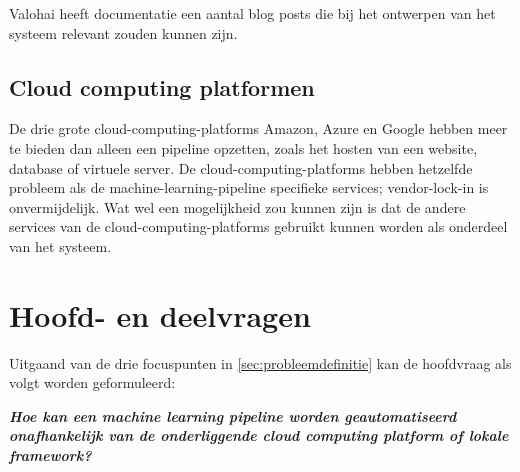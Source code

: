 Valohai heeft documentatie een aantal blog posts die bij het ontwerpen van het systeem relevant zouden kunnen zijn.

\subsection{Cloud computing platformen}\label{subsec:cloud-computing-platformen}
De drie grote \glspl{cloud-computing-platform} Amazon, Azure en Google hebben meer te bieden dan alleen een pipeline opzetten, zoals het hosten van een website, database of virtuele server. De \glspl{cloud-computing-platform} hebben hetzelfde probleem als de \gls{machine-learning-pipeline} specifieke services; \gls{vendor-lock-in} is onvermijdelijk. Wat wel een mogelijkheid zou kunnen zijn is dat de andere services van de \glspl{cloud-computing-platform} gebruikt kunnen worden als onderdeel van het systeem.


\section{Hoofd- en deelvragen}\label{sec:hoofd-en-deelvragen}
Uitgaand van de drie focuspunten in \autoref{sec:probleemdefinitie} kan de hoofdvraag als volgt worden geformuleerd:\smallskip

\begin{center}
  \textbf{
    \textit{
      Hoe kan een machine learning pipeline worden geautomatiseerd onafhankelijk van de onderliggende cloud computing platform of lokale framework?
    }
  }
\end{center}\smallskip

